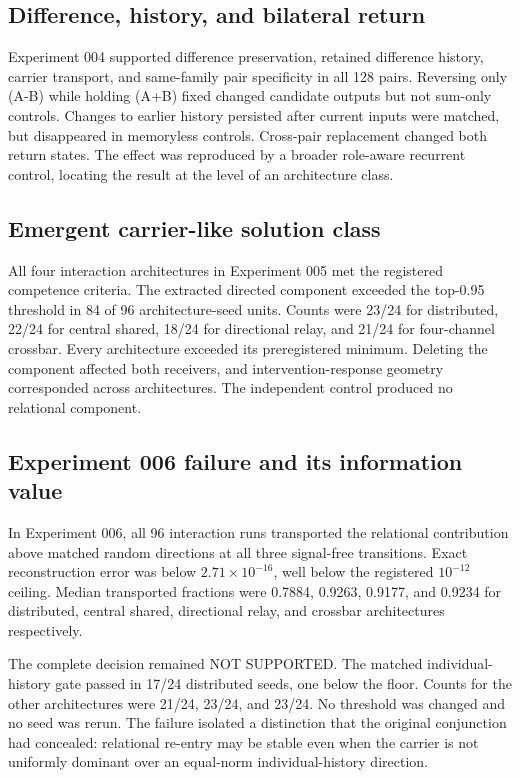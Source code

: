 \documentclass[11pt,a4paper]{article}
\newcommand{\statusnotsupported}{\textsf{NOT SUPPORTED}}
\begin{document}
\subsection{Difference, history, and bilateral return}

Experiment 004 supported difference preservation, retained difference history, carrier transport, and same-family pair specificity in all 128 pairs. Reversing only (A-B) while holding (A+B) fixed changed candidate outputs but not sum-only controls. Changes to earlier history persisted after current inputs were matched, but disappeared in memoryless controls. Cross-pair replacement changed both return states. The effect was reproduced by a broader role-aware recurrent control, locating the result at the level of an architecture class.

\subsection{Emergent carrier-like solution class}

All four interaction architectures in Experiment 005 met the registered competence criteria. The extracted directed component exceeded the top-0.95 threshold in 84 of 96 architecture-seed units. Counts were 23/24 for distributed, 22/24 for central shared, 18/24 for directional relay, and 21/24 for four-channel crossbar. Every architecture exceeded its preregistered minimum. Deleting the component affected both receivers, and intervention-response geometry corresponded across architectures. The independent control produced no relational component.

\subsection{Experiment 006 failure and its information value}

In Experiment 006, all 96 interaction runs transported the relational contribution above matched random directions at all three signal-free transitions. Exact reconstruction error was below $2.71\times10^{-16}$, well below the registered $10^{-12}$ ceiling. Median transported fractions were 0.7884, 0.9263, 0.9177, and 0.9234 for distributed, central shared, directional relay, and crossbar architectures respectively.

The complete decision remained \statusnotsupported. The matched individual-history gate passed in 17/24 distributed seeds, one below the floor. Counts for the other architectures were 21/24, 23/24, and 23/24. No threshold was changed and no seed was rerun. The failure isolated a distinction that the original conjunction had concealed: relational re-entry may be stable even when the carrier is not uniformly dominant over an equal-norm individual-history direction.
\end{document}
